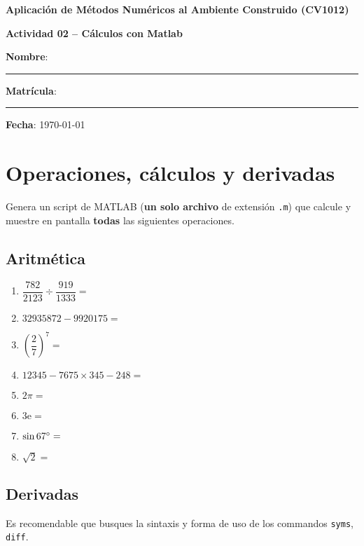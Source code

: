 \documentclass[spanish, 10pt]{article}
\newcommand{\matlab}[1]{\lstinline[style=Matlab-pyglike]!#1!}
\begin{document}
\begin{center}
	{\Large \textbf{Aplicación de Métodos Numéricos al Ambiente Construido (CV1012)}}
	
	\bigskip
	{\large \textbf{Actividad 02 -- Cálculos con Matlab}}
\end{center}

\bigskip
{\large \textbf{Nombre}: \rule{13.7 cm}{0.4mm}}



\bigskip
{\large \textbf{Matrícula}: \rule{5 cm}{0.4mm}} \hfill {\large \textbf{Fecha}: \today}

\bigskip

\section{Operaciones, cálculos y derivadas}

Genera un script de MATLAB (\textbf{un solo archivo} de extensión \texttt{.m}) que calcule y muestre en pantalla \textbf{todas} las siguientes operaciones.

\subsection{Aritmética}

\begin{enumerate}[label=\alph*)]
	\item $\dfrac{782}{2123} \div \dfrac{919}{1333} =$
	\item $32935872 - 9920175 =$
	\item $\left( \dfrac{2}{7} \right)^{7} =$
	\item $12345 - 7675 \times 345 - 248 =$
	\item $2 \pi =$
	\item $3 \mathrm{e} =$
	\item $\sin 67 \degree =$
	\item $\sqrt{2} =$
\end{enumerate}

\subsection{Derivadas}

Es recomendable que busques la sintaxis y forma de uso de los commandos \matlab{syms}, \matlab{diff}.
\end{document}

